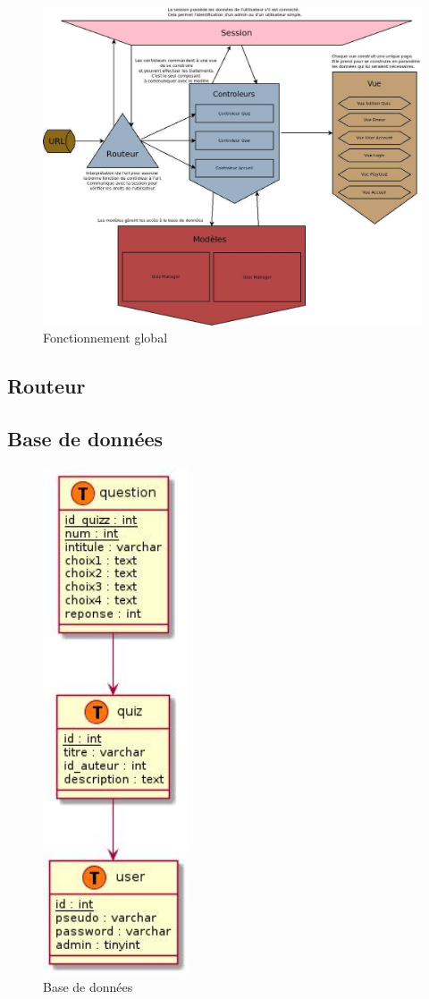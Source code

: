 \documentclass[12pt,titlepage]{article}
\begin{document}
\begin{figure}[!h]
\centering
\includegraphics[width=16cm]{schemaFonctionnement.jpg}
\caption{Fonctionnement global}
\end{figure}

\newpage

\subsection{Routeur}

\subsection{Base de données}

\begin{figure}[!h]
\centering
\includegraphics[height=15cm]{schemaBdd.jpg}
\caption{Base de données}
\end{figure}
\end{document}
